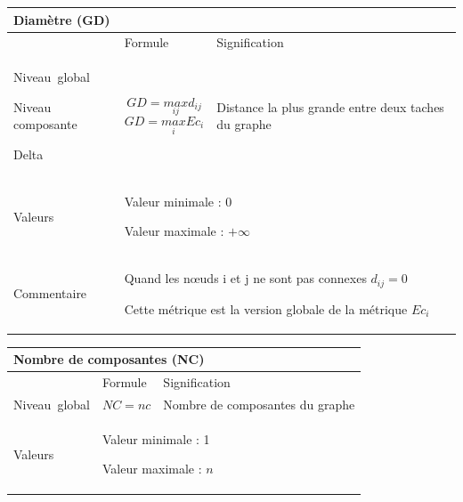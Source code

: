 \documentclass{article}
\begin{document}
\begin{table}[H]
\begin{tabular}{|m{3.24cm}|m{4.4810004cm}m{7.924cm}|}

\hline
\multicolumn{3}{|m{16.044998cm}|}{Diamètre (GD)}\\\hline
 &
\multicolumn{1}{m{4.4810004cm}|}{Formule} &
Signification\\\hline
Niveau~global  

Niveau composante

Delta &
\multicolumn{1}{m{4.4810004cm}|}{\begin{equation*}
\mathit{GD}=\underset{\mathit{ij}}{\mathit{max}}{d}_{\mathit{ij}}
\end{equation*}
\begin{equation*}
\mathit{GD}=\underset{i}{\mathit{max}}{\mathit{Ec}}_{i}
\end{equation*}
} &
Distance la plus grande entre deux taches du graphe\\\hline
Valeurs &
\multicolumn{2}{m{12.6050005cm}|}{Valeur minimale : 0

Valeur maximale :  $+{\infty}$

}\\\hline
Commentaire &
\multicolumn{2}{m{12.6050005cm}|}{Quand les nœuds i et j ne sont pas connexes  ${d}_{\mathit{ij}}=0$

Cette métrique est la version globale de la métrique  ${\mathit{Ec}}_{i}$

}\\\hline
\end{tabular}
\end{table}
\begin{table}[H]
\raggedright
\begin{tabular}{|m{3.24cm}|m{4.4810004cm}m{7.924cm}|}

\hline
\multicolumn{3}{|m{16.044998cm}|}{Nombre de composantes (NC)}\\\hline
 &
\multicolumn{1}{m{4.4810004cm}|}{Formule} &
Signification\\\hline
Niveau~global 

 &
\multicolumn{1}{m{4.4810004cm}|}{\begin{equation*}
\mathit{NC}=\mathit{nc}
\end{equation*}
} &
Nombre de composantes du graphe\\\hline
Valeurs &
\multicolumn{2}{m{12.6050005cm}|}{Valeur minimale : 1

Valeur maximale :  $n$

}\\\hline
\end{tabular}
\end{table}
\end{document}
